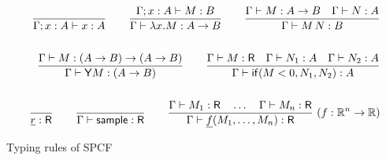 \begin{figure*}[htb]
\begin{align*}
  \frac{}{\Gamma ; x:A \vdash x:A} 
  \qquad
  \frac{\Gamma ; x:A \vdash M : B}{\Gamma \vdash \lambda x.M : A \to B} 
  \qquad
  \frac{\Gamma \vdash M:A \to B \quad \Gamma \vdash N : A}{\Gamma \vdash M \, N : B} 
  \\ \\
  \qquad
  \frac{\Gamma \vdash M : (A \to B) \to (A \to B)}{\Gamma \vdash \mathsf{Y} M : (A \to B)}
  \qquad
  \frac{\Gamma \vdash M : \textsf{R} \quad \Gamma \vdash N_1 : A \quad \Gamma \vdash N_2 : A}{\Gamma \vdash \mathsf{if}(M < 0, N_1, N_2) : A}    
  \\ \\
  \qquad
  \frac{}{\underline{r} : \textsf{R}} 
  \qquad
  \frac{}{\Gamma \vdash \mathsf{sample} : \textsf{R}}
  \qquad
  \frac{\Gamma \vdash M_1:\textsf{R} \quad \dots \quad \Gamma \vdash M_n:\textsf{R}}{\Gamma \vdash \underline{f}(M_1,\dots,M_n) : \textsf{R}} \ (f : \mathbb{R}^n \to \mathbb{R})
\end{align*}
\caption{Typing rules of SPCF \label{fig:typing rules}}
\end{figure*}

